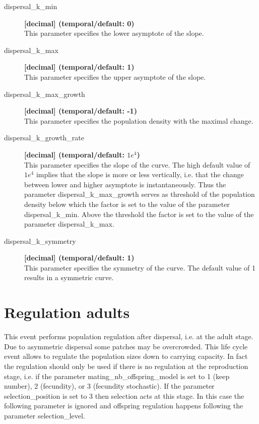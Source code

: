 \documentclass[letterpaper,12pt,oneside]{book}
\begin{document}
\begin{description}
\item[dispersal\_k\_min] \textbf{[decimal] (temporal/default: 0)}\\
This parameter specifies the lower asymptote of the slope.
\item[dispersal\_k\_max] \textbf{[decimal] (temporal/default: 1)}\\
This parameter specifies the upper asymptote of the slope.
\item[dispersal\_k\_max\_growth] \textbf{[decimal] (temporal/default: -1)}\\
This parameter specifies the population density with the maximal change.
\item[dispersal\_k\_growth\_rate] \textbf{[decimal] (temporal/default: $1e^{4}$)}\\
This parameter specifies the slope of the curve. The high default value of $1e^{4}$ implies that the slope is more or less vertically, i.e. that the change between lower and higher asymptote is instantaneously. Thus the parameter \textsf{dispersal\_k\_max\_growth} serves as threshold of the population density below which the factor is set to the value of the parameter \textsf{dispersal\_k\_min}. Above the threshold the factor is set to the value of the parameter \textsf{dispersal\_k\_max}.  
\item[dispersal\_k\_symmetry] \textbf{[decimal] (temporal/default: 1)}\\
This parameter specifies the symmetry of the curve. The default value of 1 results in a symmetric curve.
\end{description}



\section{Regulation adults}\label{7regulation}
This event performs population regulation after dispersal, i.e. at the adult stage. Due to asymmetric dispersal some patches may be overcrowded. This life cycle event allows to regulate the population sizes down to carrying capacity. In fact the regulation should only be used if there is no regulation at the reproduction stage, i.e. if the parameter \textsf{mating\_nb\_offspring\_model} is set to 1 (keep number), 2 (fecundity), or 3 (fecundity stochastic). If the parameter \textsf{selection\_position} is set to 3 then selection acts at this stage. In this case the following parameter is ignored and offspring regulation happens following the parameter \textsf{selection\_level}.  
\end{document}
